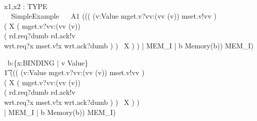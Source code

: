 \begin{circus}%
[TYPE]\\
\circchannel x1,x2 : TYPE\\
 \circprocess\ ~SimpleExample ~\circdef~\circbegin
  A1 \circdef ((( 
              (\Intchoice v:Value \circspot mget.v?vv:(vv \in \delta(v)) \then mset.v!vv \then \Skip) \circseq \\
                ( \circmu X \circspot
                    ( mget.v?vv:(vv \in \delta(v)) \then \\
                        ( rd.req?dumb \then rd.ack!v \then \Skip \\
                          \extchoice wrt.req?x \then mset.v!x 
                                    \then wrt.ack?dumb \then \Skip
                        )
                    ) \circseq\ X
                )
            )  \lpar {} | MEM\_I | { b } \rpar Memory(b)) 
              \circhide MEM\_I)
            

  \circspot
            \circvar\ b:\{x:BINDING | v \in Value\} \circspot \\
            \t1
            ((( 
                        (\Intchoice v:Value \circspot mget.v?vv:(vv \in \delta(v)) \then mset.v!vv \then \Skip) \circseq \\
                            ( \circmu X \circspot
                                ( mget.v?vv:(vv \in \delta(v)) \then \\
                                    ( rd.req?dumb \then rd.ack!v \then \Skip \\
                                      \extchoice wrt.req?x \then mset.v!x 
                                                \then wrt.ack?dumb \then \Skip
                                    )
                                ) \circseq\ X
                            )
                        ) \\
                        \lpar {} | MEM\_I | { b } \rpar Memory(b))
                        \circhide MEM\_I)
  \circend
\end{circus}